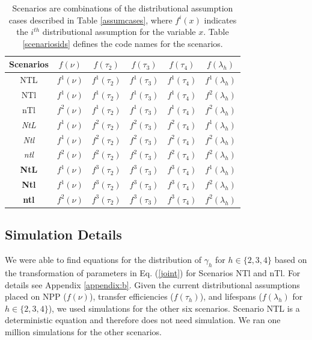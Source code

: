 \documentclass[oneside,12pt,final]{sty/ucthesis-CA2012}
\begin{document}
\begin{mainmatter}
\begin{table}[H]
\centering
\caption{Scenarios are combinations of the distributional assumption cases described in Table \ref{assumcases}, where $f^i(x)$ indicates the $i^{th}$ distributional assumption for the variable $x$. Table \ref{scenariosids} defines the code names for the scenarios. }
\begin{tabular}{|c|c|c|c|c|c|}
  \hline \small
   Scenarios & $f(\nu)$ & $f(\tau_2)$ & $f(\tau_3)$ & $f(\tau_4)$ & $f(\lambda_h)$  \\ 
  \hline
  NTL & $f^1(\nu)$ & $f^1(\tau_2)$ & $f^1(\tau_3)$ & $f^1(\tau_4)$ & $f^1(\lambda_h)$ \\
  NTl & $f^1(\nu)$ & $f^1(\tau_2)$ & $f^1(\tau_3)$ & $f^1(\tau_4)$ & $f^2(\lambda_h)$ \\
  nTl & $f^2(\nu)$ & $f^1(\tau_2)$ & $f^1(\tau_3)$ & $f^1(\tau_4)$ & $f^2(\lambda_h)$ \\   
  \textit{NtL} & $f^1(\nu)$ & $f^2(\tau_2)$ & $f^2(\tau_3)$ & $f^2(\tau_4)$ & $f^1(\lambda_h)$ \\
  \textit{Ntl} & $f^1(\nu)$ & $f^2(\tau_2)$ & $f^2(\tau_3)$ & $f^2(\tau_4)$ & $f^2(\lambda_h)$ \\ 
  \textit{ntl} & $f^2(\nu)$ & $f^2(\tau_2)$ & $f^2(\tau_3)$ & $f^2(\tau_4)$ & $f^2(\lambda_h)$ \\
  \textbf{NtL} & $f^1(\nu)$ & $f^3(\tau_2)$ & $f^3(\tau_3)$ & $f^3(\tau_4)$ & $f^1(\lambda_h)$ \\
  \textbf{Ntl} & $f^1(\nu)$ & $f^3(\tau_2)$ & $f^3(\tau_3)$ & $f^3(\tau_4)$ & $f^2(\lambda_h)$ \\
  \textbf{ntl} & $f^2(\nu)$ & $f^3(\tau_2)$ & $f^3(\tau_3)$ & $f^3(\tau_4)$ & $f^2(\lambda_h)$ \\
  \hline
\end{tabular} 
\label{scenarios}
\end{table}

\subsection{Simulation Details}
We were able to find equations for the distribution of $\gamma_h$ for $h \in \{2, 3, 4\}$ based on the transformation of parameters in Eq. (\ref{joint}) for Scenarios NTl and nTl. For details see Appendix \ref{appendix:b}. Given the current distributional assumptions placed on NPP ($f(\nu)$), transfer efficiencies ($f(\tau_h)$), and lifespans ($f(\lambda_h)$ for $h \in \{2, 3, 4\}$), we used simulations for the other six scenarios. Scenario NTL is a deterministic equation and therefore does not need simulation. We ran one million simulations for the other scenarios. 


\end{mainmatter}
\end{document}
